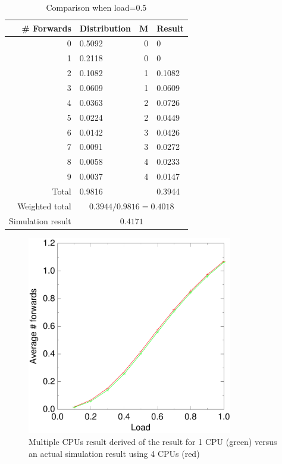 \documentclass[10pt,a4paper]{article}
\begin{document}
\begin{table}
\centering
\begin{tabular}{|r|l|r|l|} \hline
\# Forwards & Distribution & M & Result \\ \hline
0 & 0.5092 & 0 & 0 \\ \hline
1 & 0.2118 & 0 & 0 \\ \hline
2 & 0.1082 & 1 & 0.1082 \\ \hline
3 & 0.0609 & 1 & 0.0609 \\ \hline
4 & 0.0363 & 2 & 0.0726 \\ \hline
5 & 0.0224 & 2 & 0.0449 \\ \hline
6 & 0.0142 & 3 & 0.0426 \\ \hline
7 & 0.0091 & 3 & 0.0272 \\ \hline
8 & 0.0058 & 4 & 0.0233 \\ \hline
9 & 0.0037 & 4 & 0.0147 \\ \hline
Total &  0.9816 & &  0.3944 \\ \hline
Weighted total & \multicolumn{3}{|c|}{$0.3944/0.9816 = 0.4018 $} \\ \hline
Simulation result & \multicolumn{3}{|c|}{$0.4171$} \\ \hline
\end{tabular}
\caption{Comparison when load=0.5}
\label{tabdistr}
\end{table}

\begin{figure}[h!tb]
\centering
\includegraphics[width=0.8\textwidth]{data/right_5_2.pdf}
\caption{Multiple CPUs result derived of the result for 1 CPU (green) versus an actual simulation result using 4 CPUs (red)}
\label{figcpusmatch}
\end{figure}
\end{document}
